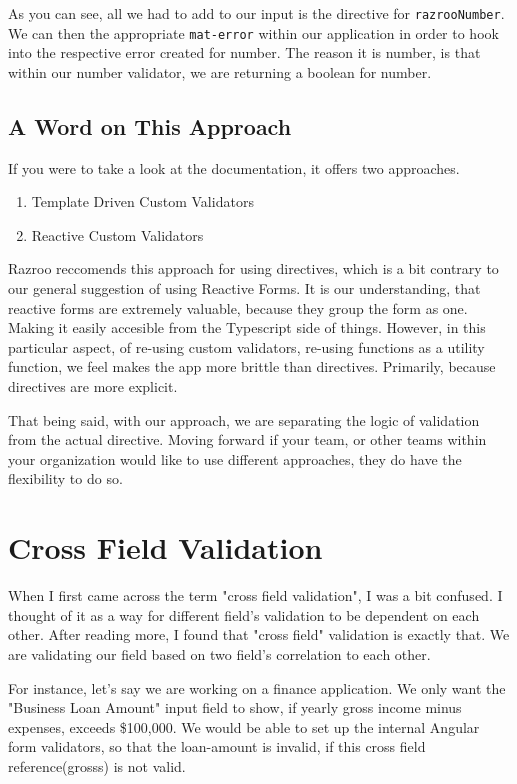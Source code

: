 As you can see, all we had to add to our input is the directive for 
\lstinline{razrooNumber}. We can then the appropriate \lstinline{mat-error}
within our application in order to hook into the respective error created for number.
The reason it is number, is that within our number validator, we are returning a 
boolean for number. 

\subsection{A Word on This Approach}
If you were to take a look at the documentation, it offers two approaches.
\begin{enumerate}
  \item Template Driven Custom Validators 
  \item Reactive Custom Validators 
\end{enumerate}

Razroo reccomends this approach for using directives, which is a bit contrary to our 
general suggestion of using Reactive Forms. It is our understanding, that reactive 
forms are extremely valuable, because they group the form as one. Making it 
easily accesible from the Typescript side of things. However, in this
particular aspect, of re-using custom validators, re-using functions as a utility 
function, we feel makes the app more brittle than directives. Primarily, because 
directives are more explicit. 

That being said, with our approach, we are separating the logic of validation from 
the actual directive. Moving forward if your team, or other teams within your 
organization would like to use different approaches, they do have the 
flexibility to do so. 

\section{Cross Field Validation}
When I first came across the term "cross field validation", I was a bit 
confused. I thought of it as a way for different field's validation to 
be dependent on each other. After reading more, I found that "cross 
field" validation is exactly that. We are validating our field based on 
two field's correlation to each other. 

For instance, let's say we are working on a finance application. We only want
the "Business Loan Amount" input field to show, if yearly gross income minus expenses, 
exceeds \$100,000. We would be able to set up the internal Angular form validators,
so that the loan-amount is invalid, if this cross field reference(grosss) is not valid. 

